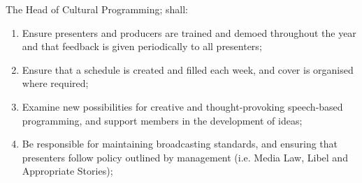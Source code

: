 \item The Head of Cultural Programming; shall:
\begin{enumerate}[label*=\arabic*.]
    \item Ensure presenters and producers are trained and demoed throughout the year and that feedback is given periodically to all presenters;
    \item Ensure that a schedule is created and filled each week, and cover is organised where required;
    \item Examine new possibilities for creative and thought-provoking speech-based programming, and support members in the development of ideas;
    \item Be responsible for maintaining broadcasting standards, and ensuring that presenters follow policy outlined by management (i.e. Media Law, Libel and Appropriate Stories);
\end{enumerate}
